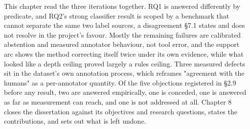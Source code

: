 This chapter read the three iterations together. RQ1 is answered differently by predicate, and RQ2's strong classifier result is scoped by a benchmark that cannot separate the same two label sources, a disagreement \S{}7.1 states and does not resolve in the project's favour. Mostly the remaining failures are calibrated abstention and measured annotator behaviour, not tool error, and the support arc shows the method correcting itself twice under its own evidence, while what looked like a depth ceiling proved largely a rules ceiling. Three measured defects sit in the dataset's own annotation process, which reframes "agreement with the humans" as a per-annotator quantity. Of the five objections registered in \S{}2.9 before any result, two are answered empirically, one is conceded, one is answered as far as measurement can reach, and one is not addressed at all. Chapter 8 closes the dissertation against its objectives and research questions, states the contributions, and sets out what is left undone.